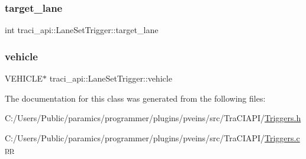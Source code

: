 \subsubsection{\texorpdfstring{target\+\_\+lane}{target\_lane}}
{\footnotesize\ttfamily int traci\+\_\+api\+::\+Lane\+Set\+Trigger\+::target\+\_\+lane}

\mbox{\label{classtraci__api_1_1_lane_set_trigger_aec89039cf41fe086fc46c5748e9b933b}} 
\subsubsection{\texorpdfstring{vehicle}{vehicle}}
{\footnotesize\ttfamily V\+E\+H\+I\+C\+LE$\ast$ traci\+\_\+api\+::\+Lane\+Set\+Trigger\+::vehicle}



The documentation for this class was generated from the following files\+:\begin{DoxyCompactItemize}
\item 
C\+:/\+Users/\+Public/paramics/programmer/plugins/pveins/src/\+Tra\+C\+I\+A\+P\+I/\hyperlink{_triggers_8h}{Triggers.\+h}\item 
C\+:/\+Users/\+Public/paramics/programmer/plugins/pveins/src/\+Tra\+C\+I\+A\+P\+I/\hyperlink{_triggers_8cpp}{Triggers.\+cpp}\end{DoxyCompactItemize}
